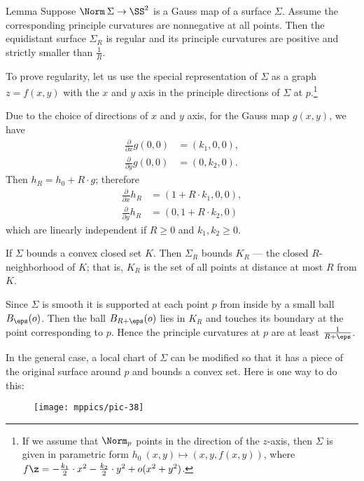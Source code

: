 \begin{thm}{Lemma}\label{lem:curc<1/R}
Suppose $\Norm\:\Sigma\to \SS^2$ is a Gauss map of a surface $\Sigma$.
Assume the corresponding principle curvatures are nonnegative at all points. 
Then the equidistant surface $\Sigma_R$ is regular and its principle curvatures are positive and strictly smaller than $\tfrac1R$.
\end{thm}

To prove regularity, let us use the special representation of $\Sigma$ as a graph $z=f(x,y)$ with the $x$ and $y$ axis in the principle directions of $\Sigma$ at $p$.\footnote{If we assume that $\Norm_p$ points in the direction of the $z$-axis, then $\Sigma$ is given in parametric form 
$h_0\:(x,y)\mapsto (x,y,f(x,y))$,
where $f\z=-\tfrac{k_1}2\cdot x^2-\tfrac{k_2}2\cdot y^2+o(x^2+y^2)$.}

Due to the choice of directions of $x$ and $y$ axis,
for the Gauss map $g(x,y)$, we have 
\begin{align*}
\tfrac{\partial}{\partial x}g(0,0)&=(k_1,0,0),
\\
\tfrac{\partial}{\partial y}g(0,0)&=(0,k_2,0).
\end{align*}
Then $h_R=h_0+R\cdot g$; therefore
\begin{align*}
\tfrac{\partial}{\partial x} h_R&=(1+R\cdot k_1,0,0),
\\
\tfrac{\partial}{\partial y} h_R&=(0,1+R\cdot k_2,0)
\end{align*}
which are linearly independent if $R\ge0$ and $k_1,k_2\ge 0$. 

If $\Sigma$ bounds a convex closed set $K$.
Then $\Sigma_R$ bounds $K_R$ --- the closed $R$-neighborhood of $K$;
that is, $K_R$ is the set of all points at distance at most $R$ from $K$.

Since $\Sigma$ is smooth it is supported at each point $p$ from inside by a small ball $B_\eps(o)$.
Then the ball $B_{R+\eps}(o)$ lies in $K_R$ and touches its boundary at the point corresponding to $p$.
Hence the principle curvatures at $p$ are at least $\tfrac1{R+\eps}$.

In the general case, a local chart of $\Sigma$ can be modified so that it has a piece of the original surface around $p$  and bounds a convex set.
Here is one way to do this:

\begin{wrapfigure}{o}{30 mm}
\vskip-0mm
\centering
\texttt{[image: mppics/pic-38]}
\vskip-0mm
\end{wrapfigure}

